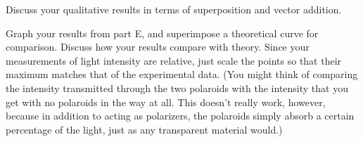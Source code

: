 \analysis

Discuss your qualitative results in terms of superposition
and vector addition.

Graph your results from part E, and superimpose a
theoretical curve for comparison. Discuss how your results
compare with theory. Since your measurements of light
intensity are relative, just scale the points so
that their maximum matches that of the experimental data. (You
might think of comparing the intensity transmitted through
the two polaroids with the intensity that you get with no
polaroids in the way at all. This doesn't really work,
however, because in addition to acting as polarizers, the
polaroids simply absorb a certain percentage of the light,
just as any transparent material would.)


